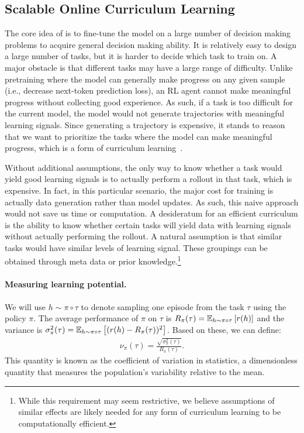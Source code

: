 \subsection{Scalable Online Curriculum Learning} \label{section:curriculum}
The core idea of \ours{} is to fine-tune the model on a large number of decision making problems to acquire general decision making ability. It is relatively easy to design a large number of tasks, but it is harder to decide which task to train on. A major obstacle is that different tasks may have a large range of difficulty. Unlike pretraining where the model can generally make progress on any given sample (i.e., decrease next-token prediction loss), an RL agent cannot make meaningful progress without collecting good experience. As such, if a task is too difficult for the current model, the model would not generate trajectories with meaningful learning signals. Since generating a trajectory is expensive, it stands to reason that we want to prioritize the tasks where the model can make meaningful progress, which is a form of curriculum learning~\citep{bengio2009curriculum}.

Without additional assumptions, the only way to know whether a task would yield good learning signals is to actually perform a rollout in that task, which is expensive.
In fact, in this particular scenario, the major cost for training is actually data generation rather than model updates.
As such, this naive approach would not save us time or computation.
A desideratum for an efficient curriculum is the ability to know whether certain tasks will yield data with learning signals without actually performing the rollout.
A natural assumption is that similar tasks would have similar levels of learning signal. 
These groupings can be obtained through meta data or prior knowledge.\footnote{While this requirement may seem restrictive, we believe assumptions of similar effects are likely needed for any form of curriculum learning to be computationally efficient.}

\paragraph{Measuring learning potential.} We will use $h \sim \pi \circ \tau$ to denote sampling one episode from the task $\tau$ using the policy $\pi$. The average performance of $\pi$ on $\tau$ is $R_\pi(\tau) = \mathbb{E}_{h \sim \pi \circ \tau }\left[r(h)\right]$ and the variance is $\sigma^2_\pi(\tau) = \mathbb{E}_{h \sim \pi \circ \tau }\left[(r(h) - R_\pi(\tau))^2\right]$. Based on these, we can define:
\begin{align}
\label{eq:nu}
    \nu_\pi(\tau) = \frac{\sqrt{\sigma^2_\pi(\tau)}}{R_\pi(\tau)}.
\end{align}
This quantity is known as the coefficient of variation in statistics, a dimensionless quantity that measures the population's variability relative to the mean. 


